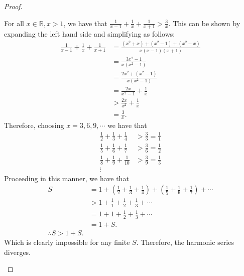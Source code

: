 \documentclass[12pt]{article}
\newcommand{\R}{\mathbb{R}} %
\newenvironment{question}[2][Question]{\begin{trivlist}
        \item[\hskip \labelsep {\bfseries #1}\hskip \labelsep {\bfseries #2.}]}{\end{trivlist}}
\begin{document}
\begin{question}{[Divergence of Harmonic Series]}
\begin{proof}
\begin{spreadlines}{0.8em}
                        For all $x\in\R,x>1$, we have that
                        $\frac{1}{x-1}+\frac{1}{x}+\frac{1}{x+1}>\frac{3}{x}$. This can be shown by
                        expanding the left hand side and simplifying as follows:
                        \begin{align*}
                                \frac{1}{x-1}+\frac{1}{x}+\frac{1}{x+1} & =\frac{(x^2+x)+(x^2-1)+(x^2-x)}{x(x-1)(x+1)} \\
                                                                        & =\frac{3x^2-1}{x(x^2-1)}                     \\
                                                                        & =\frac{2x^2+(x^2-1)}{x(x^2-1)}               \\
                                                                        & =\frac{2x}{x^2-1}+\frac{1}{x}                \\
                                                                        & >\frac{2x}{x^2}+\frac{1}{x}                  \\
                                                                        & =\frac{3}{x}.
                        \end{align*}
                        Therefore, choosing $x=3,6,9,\cdots$ we have that
                        \begin{align*}
                                \frac{1}{2}+\frac{1}{3}+\frac{1}{4}  & >\frac{3}{3}=\frac{1}{1} \\
                                \frac{1}{5}+\frac{1}{6}+\frac{1}{7}  & >\frac{3}{6}=\frac{1}{2} \\
                                \frac{1}{8}+\frac{1}{9}+\frac{1}{10} & >\frac{3}{9}=\frac{1}{3} \\
                                \vdots
                        \end{align*}
                        Proceeding in this manner, we have that
                        \begin{align*}
                                S & =1+(\frac{1}{2}+\frac{1}{3}+\frac{1}{4})+(\frac{1}{5}+\frac{1}{6}+\frac{1}{7})+\cdots \\
                                  & >1+\frac{1}{1}+\frac{1}{2}+\frac{1}{3}+\cdots                                         \\
                                  & = 1 + 1 + \frac{1}{2}+\frac{1}{3}+\cdots                                              \\
                                  & = 1 + S.                                                                              \\
                                \therefore S > 1 + S.
                        \end{align*}
                        Which is clearly impossible for any finite $S$. Therefore, the harmonic series diverges.
                \end{spreadlines}
        \end{proof}
\end{question}
\end{document}
